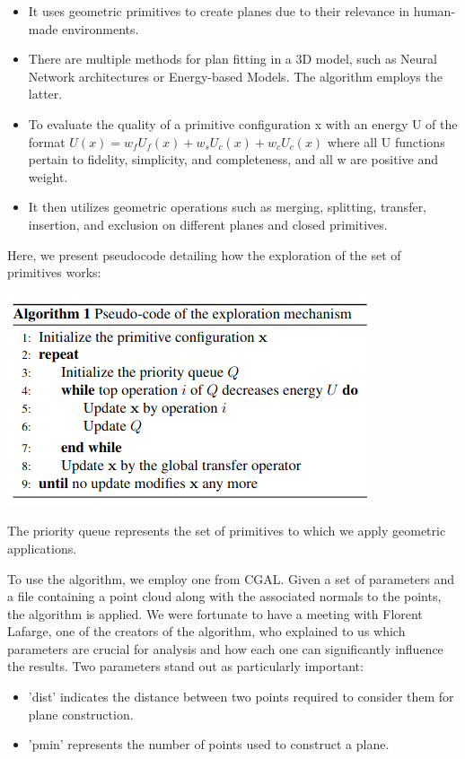 \documentclass{article}
\begin{document}
\begin{itemize}
\item It uses geometric primitives to create planes due to their relevance in human-made environments.
\item There are multiple methods for plan fitting in a 3D model, such as Neural Network architectures or Energy-based Models. The algorithm employs the latter.
\item To evaluate the quality of a primitive configuration x with an energy U of the format
  \newline 
  $        U(x) = w_f U_f(x) + w_s U_c(x) + w_c U_c(x)       $
  \newline
  where all U functions pertain to fidelity, simplicity, and completeness, and all w are positive and weight.
  \item It then utilizes geometric operations such as merging, splitting, transfer, insertion, and exclusion on different planes and closed primitives.
\end{itemize}
  Here, we present pseudocode detailing how the exploration of the set of primitives works:
\begin{center}
  \includegraphics[scale =  0.5]{../../images/Pseudo_code_exploration.png}
\end{center}
The priority queue represents the set of primitives to which we apply geometric applications.

To use the algorithm, we employ one from CGAL. Given a set of parameters and a file containing a point cloud along with the associated normals to the points,
the algorithm is applied. We were fortunate to have a meeting with Florent Lafarge, one of the creators of the algorithm,
who explained to us which parameters are crucial for analysis and how each one can significantly influence the results.
Two parameters stand out as particularly important: 
\begin{itemize}
  \item 'dist' indicates the distance between two points required to consider them for plane construction.
  \item 'pmin' represents the number of points used to construct a plane.
\end{itemize}
\end{document}
